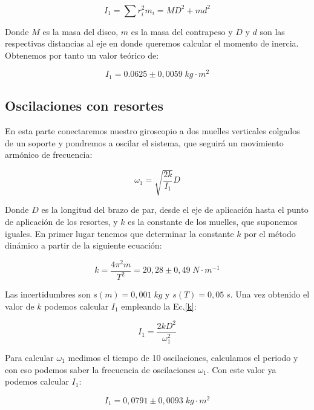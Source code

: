 \documentclass[a4paper,12pt,titlepage]{article}
\begin{document}
\begin{equation}
    I_1 = \sum r_i^2m_i = MD^2+md^2
\end{equation}

Donde $M$ es la masa del disco, $m$ es la masa del contrapeso y $D$ y $d$ son las respectivas distancias al eje en donde queremos calcular el momento de inercia. Obtenemos por tanto un valor teórico de:

\begin{equation}
    I_1 = 0.0625 \pm 0,0059 \;kg\cdot m^2
\end{equation}

\subsection{Oscilaciones con resortes}

En esta parte conectaremos nuestro giroscopio a dos muelles verticales colgados de un soporte y pondremos a oscilar el sistema, que seguirá un movimiento armónico de frecuencia:

\begin{equation}
    \omega_1 = \sqrt{\frac{2k}{I_1}}D
    \label{k}
\end{equation}

Donde $D$ es la longitud del brazo de par, desde el eje de aplicación hasta el punto de aplicación de los resortes, y $k$ es la constante de los muelles, que suponemos iguales. En primer lugar tenemos que determinar la constante $k$ por el método dinámico a partir de la siguiente ecuación:

\begin{equation}
    k = \frac{4\pi^2m}{T^2} = 20,28 \pm 0,49 \;N\cdot m^{-1}
\end{equation}

Las incertidumbres son $s(m)=0,001\;kg$ y $s(T)=0,05\;s$. Una vez obtenido el valor de $k$ podemos calcular $I_1$ empleando la Ec.\ref{k}:

\begin{equation}
    I_1 = \frac{2kD^2}{\omega_1^2}
\end{equation}

Para calcular $\omega_1$ medimos el tiempo de 10 oscilaciones, calculamos el periodo y con eso podemos saber la frecuencia de oscilaciones $\omega_1$. Con este valor ya podemos calcular $I_1$:

\begin{equation}
    I_1 = 0,0791 \pm 0,0093 \;kg\cdot m^2
\end{equation}
\end{document}
